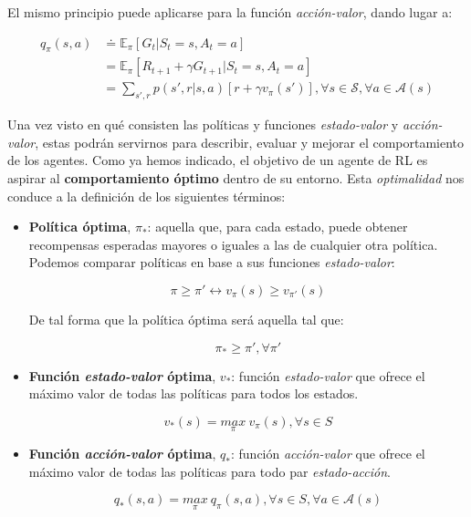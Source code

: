 El mismo principio puede aplicarse para la función \textit{acción-valor}, dando lugar a:

\begin{equation}
    \begin{split}
        q_\pi(s,a) & \doteq \mathds{E}_\pi [G_t | S_t = s, A_t = a] \\
        & = \mathds{E}_\pi [R_{t+1} + \gamma G_{t+1} | S_t = s, A_t = a] \\ 
        & = \sum_{s', r}p(s',r|s,a)[r + \gamma v_\pi(s')], \forall s \in \mathcal{S}, \forall a \in \mathcal{A}(s)
    \end{split}
\end{equation}

Una vez visto en qué consisten las políticas y funciones \textit{estado-valor} y \textit{acción-valor}, estas podrán servirnos para describir, evaluar y mejorar el comportamiento de los agentes. Como ya hemos indicado, el objetivo de un agente de RL es aspirar al \textbf{comportamiento óptimo} dentro de su entorno. Esta \textit{optimalidad} nos conduce a la definición de los siguientes términos:

\begin{itemize}
    \item \textbf{Política óptima}, $\pi_*$: aquella que, para cada estado, puede obtener recompensas esperadas mayores o iguales a las de cualquier otra política. Podemos comparar políticas en base a sus funciones \textit{estado-valor}:
    
        \begin{equation}
            \label{policy-comparison}
            \pi \geq \pi' \leftrightarrow v_\pi(s) \geq v_{\pi'}(s)
        \end{equation}
        
    De tal forma que la política óptima será aquella tal que:
    
        \begin{equation}
            \pi_* \geq \pi', \forall \pi'
        \end{equation}
   
    \item \textbf{Función \textit{estado-valor} óptima}, $v_*$: función \textit{estado-valor} que ofrece el máximo valor de todas las políticas para todos los estados.
    
        \begin{equation}
            v_*(s) = \underset{\pi}{max}\ v_\pi(s), \forall s \in S
        \end{equation}
    
    \item \textbf{Función \textit{acción-valor} óptima}, $q_*$: función \textit{acción-valor} que ofrece el máximo valor de todas las políticas para todo par \textit{estado-acción}.
    
        \begin{equation}
            q_*(s, a) = \underset{\pi}{max}\ q_\pi(s, a), \forall s \in S, \forall a \in \mathcal{A}(s)
        \end{equation}
\end{itemize}

